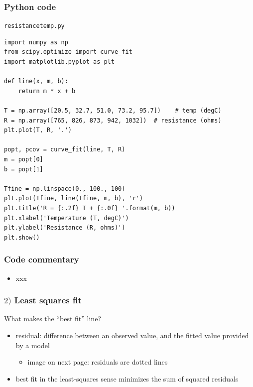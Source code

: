 \documentclass[english,14pt]{beamer}
\begin{document}
\begin{frame}[fragile]

\frametitle{Python code}

\vspace*{-3mm}

\texttt{resistancetemp.py}
\vspace*{-2mm}

\begin{lstlisting}[style=CStyle,basicstyle=\scriptsize]
import numpy as np
from scipy.optimize import curve_fit
import matplotlib.pyplot as plt

def line(x, m, b):
    return m * x + b

T = np.array([20.5, 32.7, 51.0, 73.2, 95.7])    # temp (degC)
R = np.array([765, 826, 873, 942, 1032])  # resistance (ohms)
plt.plot(T, R, '.')

popt, pcov = curve_fit(line, T, R)
m = popt[0]
b = popt[1]

Tfine = np.linspace(0., 100., 100)
plt.plot(Tfine, line(Tfine, m, b), 'r')
plt.title('R = {:.2f} T + {:.0f} '.format(m, b))
plt.xlabel('Temperature (T, degC)')
plt.ylabel('Resistance (R, ohms)')
plt.show()
\end{lstlisting}

\end{frame}


\begin{frame}[fragile]

\frametitle{Code commentary}

\begin{itemize}
	\item xxx
\end{itemize}

\end{frame}


\begin{frame}[fragile]

\frametitle{$2)$ Least squares fit}

What makes the ``best fit'' line?


\begin{itemize}
	\item residual: difference between an observed value, and the fitted value provided by a model
	\begin{itemize}
		\item image on next page: residuals are dotted lines
	\end{itemize}
	\item best fit in the least-squares sense minimizes the sum of squared residuals
\end{itemize}

\end{frame}
\end{document}
